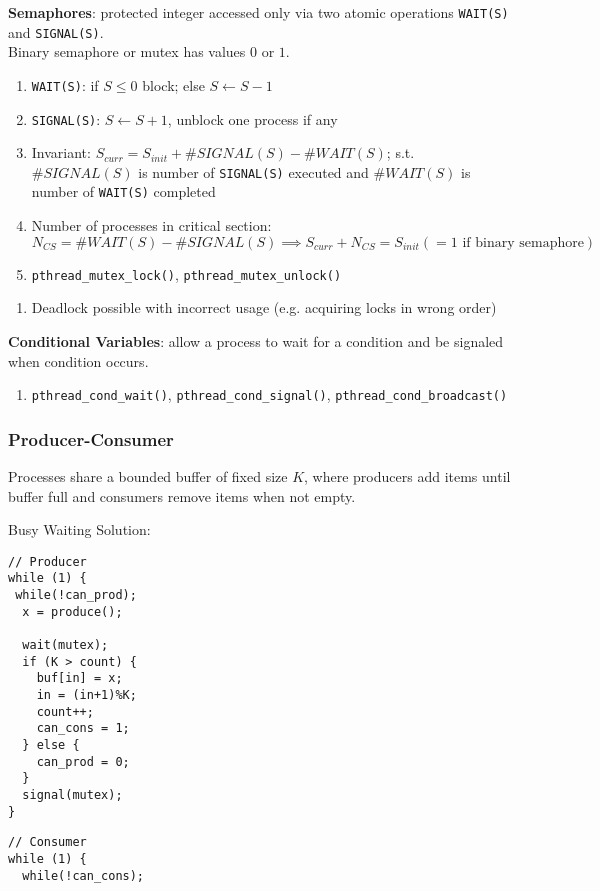 \documentclass[12pt, a4paper]{article}
\begin{document}
\begin{multicols*}{3}
\textbf{Semaphores}: protected integer accessed only via two atomic operations \lstinline|WAIT(S)| and \lstinline|SIGNAL(S)|.\\Binary semaphore or mutex has values $0$ or $1$.
\begin{enumerate}[\roman*.]
  \item \lstinline|WAIT(S)|: if $S \leq 0$ block; else $S \leftarrow S-1$
  \item \lstinline|SIGNAL(S)|: $S \leftarrow S+1$, unblock one process if any
  \item Invariant: $S_{curr} = S_{init} + \#SIGNAL(S) - \#WAIT(S)$; s.t. $\#SIGNAL(S)$ is number of \lstinline|SIGNAL(S)| executed and $\#WAIT(S)$ is number of \lstinline|WAIT(S)| completed
  \item Number of processes in critical section: $N_{CS} = \#WAIT(S) - \#SIGNAL(S) \implies S_{curr} + N_{CS} = S_{init} (=1\text{ if binary semaphore})$
  \item \lstinline|pthread_mutex_lock()|, \lstinline|pthread_mutex_unlock()|
\end{enumerate}\vspace{1pt}
\begin{enumerate}[$-$]
  \item Deadlock possible with incorrect usage (e.g. acquiring locks in wrong order)
\end{enumerate}

\textbf{Conditional Variables}: allow a process to wait for a condition and be signaled when condition occurs.
\begin{enumerate}[\roman*.]
  \item \lstinline|pthread_cond_wait()|, \lstinline|pthread_cond_signal()|, \lstinline|pthread_cond_broadcast()|
\end{enumerate}

\colbreak
\subsubsection{Producer-Consumer}
Processes share a bounded buffer of fixed size $K$, where producers add items until buffer full and consumers remove items when not empty.

Busy Waiting Solution:\\
\begin{minipage}{0.45\columnwidth}
  \begin{lstlisting}
// Producer
while (1) {
 while(!can_prod);
  x = produce();

  wait(mutex);
  if (K > count) {
    buf[in] = x;
    in = (in+1)%K;
    count++;
    can_cons = 1;
  } else {
    can_prod = 0;
  }
  signal(mutex);
}
  \end{lstlisting}
\end{minipage}
\begin{minipage}{0.5\columnwidth}
  \begin{lstlisting}
// Consumer
while (1) {
  while(!can_cons);


\end{lstlisting}
\end{minipage}
\end{multicols*}
\end{document}
